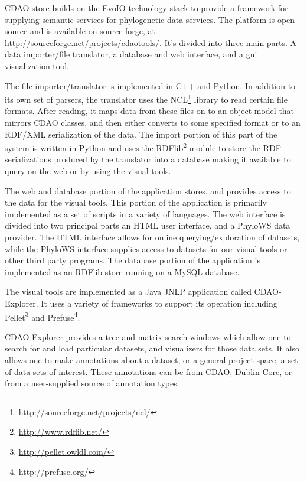\documentclass[10pt]{bmc_article}
\newenvironment{bmcformat}{\begin{raggedright}\baselineskip20pt\sloppy\setboolean{publ}{false}}{\end{raggedright}\baselineskip20pt\sloppy}
\begin{document}
\begin{bmcformat}
CDAO-store builds on the EvoIO technology stack to provide a framework for supplying semantic services
for phylogenetic data services. The platform is open-source and is available on source-forge, at
\url{http://sourceforge.net/projects/cdaotools/}. It's divided into three main parts. A data importer/file translator,
a database and web interface, and a gui visualization tool. 

The file importer/translator is implemented in C++ and Python. In addition to its own set of parsers, 
the translator uses the NCL\footnote{\url{http://sourceforge.net/projects/ncl/}} library to read certain file formats.
After reading, it maps data from these files on to an object model that mirrors CDAO classes, and then either converts
to some specified format or to an RDF/XML serialization of the data. The import portion of this part of the system is
written in Python and uses the RDFlib\footnote{\url{http://www.rdflib.net/}} module to store the RDF serializations 
produced by the translator into a database making it available to query on the web or by using the visual tools.

The web and database portion of the application stores, and provides access to the data for the visual tools. This
portion of the application is primarily implemented as a set of scripts in a variety of languages. The web interface
is divided into two principal parts an HTML user interface, and a PhyloWS data provider. The HTML interface allows 
for online querying/exploration of datasets, while the PhyloWS interface supplies access to datasets for our visual
tools or other third party programs. The database portion of the application is implemented as an RDFlib store running
on a MySQL database. 

The visual tools are implemented as a Java JNLP application called CDAO-Explorer. It uses a variety of frameworks
to support its operation including Pellet\footnote{\url{http://pellet.owldl.com/}} and
  Prefuse\footnote{\url{http://prefuse.org/}}. 

CDAO-Explorer provides a tree and matrix search windows which allow one to search for and load particular datasets,
and visualizers for those data sets. It also allows one to make annotations about a dataset, or a general project space,
a set of data sets of interest. These annotations can be from CDAO, Dublin-Core, or from a user-supplied source of
annotation types.



 

\end{bmcformat}
\end{document}
